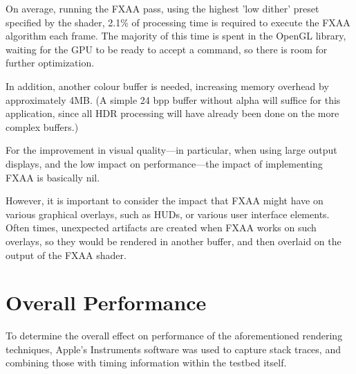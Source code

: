 \documentclass[11pt, oneside]{report}
\begin{document}
On average, running the \gls{FXAA} pass, using the highest 'low dither' preset specified by the shader, 2.1\% of  processing time is required to execute the \gls{FXAA} algorithm each frame. The majority of this time is spent in the \gls{OpenGL} library, waiting for the GPU to be ready to accept a command, so there is room for further optimization.

In addition, another colour buffer is needed, increasing memory overhead by approximately 4MB. (A simple 24 \gls{bpp} buffer without alpha will suffice for this application, since all \gls{HDR} processing will have already been done on the more complex buffers.)

For the improvement in visual quality---in particular, when using large output displays, and the low impact on performance---the impact of implementing \gls{FXAA} is basically nil.

However, it is important to consider the impact that \gls{FXAA} might have on various graphical overlays, such as HUDs, or various user interface elements. Often times, unexpected artifacts are created when \gls{FXAA} works on such overlays, so they would be rendered in another buffer, and then overlaid on the output of the \gls{FXAA} shader.

\chapter{Overall Performance}
To determine the overall effect on performance of the aforementioned rendering techniques, Apple's Instruments software was used to capture stack traces, and combining those with timing information within the testbed itself.
\end{document}
